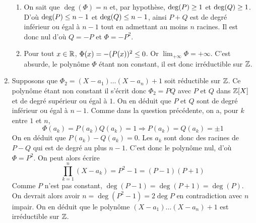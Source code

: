 \begin{enumerate}
\begin{enumerate}
\item On sait que $\deg(\Phi)=n$ et, par hypothèse, $\deg(P)\geq 1$ et $\deg(Q)\geq 1$. D'où $\deg(P)\leq n-1$ et $\deg(Q)\leq n-1$, ainsi $P+Q$ est de degré inférieur ou égal à $n-1$ tout en admettant au moins $n$ racines. Il est donc nul d'où $Q=-P$ et $\Phi=-P^2$.
\item Pour tout $x\in\mathbb{R}$, $\Phi(x)=-(P(x))^2\leq 0$. Or $\lim_{+\infty}\Phi=+\infty$. C'est absurde, le polynôme $\Phi$ étant non constant, il est donc irréductible  sur $\mathbb{Z}$.
\end{enumerate}
\item Supposons que $\Phi_2=(X-a_1)\dots(X-a_n)+1$ soit réductible sur $\mathbb{Z}$.\newline
Ce polynôme étant non constant il s'écrit donc $\Phi_2=PQ$ avec $P$ et $Q$ dans $\mathbb{Z}[X]$ et de degré supérieur ou égal à $1$. On en déduit que $P$ et $Q$ sont de degré inférieur ou égal à $n-1$.\newline
Comme dans la question précédente, on a, pour $k$ entre $1$ et $n$,
\begin{displaymath}
\Phi(a_k)=P(a_k)Q(a_k)=1 \Rightarrow P(a_k)=Q(a_k)=\pm 1 
\end{displaymath}
On en déduit que $P(a_k)-Q(a_k)=0$. Les $a_k$ sont donc des racines de $P-Q$ qui est de degré au plus $n-1$. C'est donc le polynôme nul, d'où $\Phi=P^2$.\newline
On peut alors écrire
\begin{displaymath}
 \prod_{k=1}^{n}(X-a_k)=P^2-1=(P-1)(P+1)
\end{displaymath}
Comme $P$ n'est pas constant, $\deg(P-1)=\deg(P+1)=\deg(P)$. On devrait alors avoir $n=\deg(P^2-1)=2\deg P$ en contradiction avec $n$ impair. On en déduit que le polynôme $(X-a_1)\dots(X-a_n)+1$ est irréductible sur $\mathbb{Z}$.
\end{enumerate}

